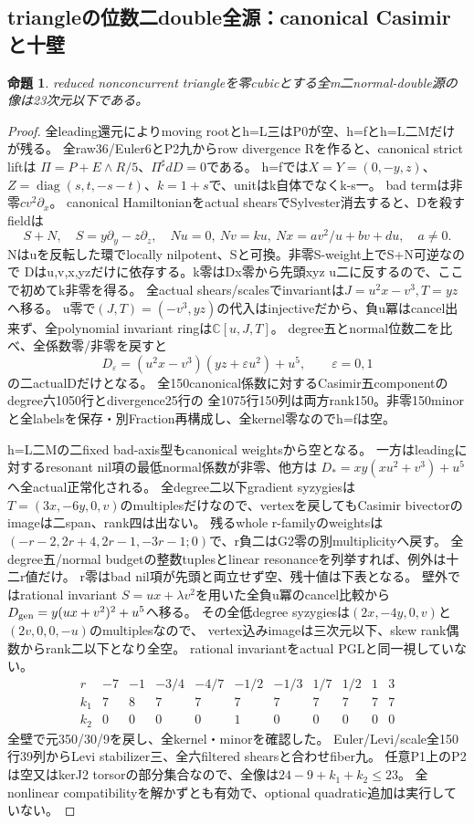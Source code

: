 \documentclass[a4paper,11pt]{ltjsarticle}
\newtheorem{proposition}{命題}[section]
\theoremstyle{definition}
\begin{document}
\subsection{triangleの位数二double全源：canonical Casimirと十壁}
\begin{proposition}\label{prop:plane-m2-triangle-double-all-G}
reduced nonconcurrent triangleを零cubicとする全m二normal-double源の像は23次元以下である。
\end{proposition}
\begin{proof}
全leading還元によりmoving rootとh=L三はP0が空、h=fとh=L二Mだけが残る。
全raw36/Euler6とP2九からrow divergence Rを作ると、canonical strict liftは
$\Pi=P+E\wedge R/5$、$\Pi^\sharp dD=0$である。
h=fでは$X=Y=(0,-y,z)$、$Z=\operatorname{diag}(s,t,-s-t)$、$k=1+s$で、unitはk自体でなくk-s一。
bad termは非零$cv^2\partial_x$。
canonical Hamiltonianをactual shearsでSylvester消去すると、Dを殺すfieldは
\[
 S+N,\quad S=y\partial_y-z\partial_z,\quad
 Nu=0,\ Nv=ku,\ Nx=av^2/u+bv+du,\quad a\ne0.
\]
Nはuを反転した環でlocally nilpotent、Sと可換。非零S-weight上でS+N可逆なので
Dはu,v,x,yzだけに依存する。k零はDx零から先頭xyz u二に反するので、ここで初めてk非零を得る。
全actual shears/scalesでinvariantは$J=u^2x-v^3,T=yz$へ移る。
u零で$(J,T)=(-v^3,yz)$の代入はinjectiveだから、負u冪はcancel出来ず、全polynomial invariant ringは$\mathbb C[u,J,T]$。
degree五とnormal位数二を比べ、全係数零/非零を戻すと
\[
 D_\varepsilon=(u^2x-v^3)(yz+\varepsilon u^2)+u^5,\qquad\varepsilon=0,1
\]
の二actualDだけとなる。
全150canonical係数に対するCasimir五componentのdegree六1050行とdivergence25行の
全1075行150列は両方rank150。非零150minorと全labelsを保存・別Fraction再構成し、全kernel零なのでh=fは空。

h=L二Mの二fixed bad-axis型もcanonical weightsから空となる。
一方はleadingに対するresonant nil項の最低normal係数が非零、他方は
$D_*=xy(xu^2+v^3)+u^5$へ全actual正常化される。
全degree二以下gradient syzygiesは$T=(3x,-6y,0,v)$のmultiplesだけなので、vertexを戻してもCasimir bivectorのimageは二span、rank四は出ない。
残るwhole r-familyのweightsは
$(-r-2,2r+4,2r-1,-3r-1;0)$で、r負二はG2零の別multiplicityへ戻す。
全degree五/normal budgetの整数tuplesとlinear resonanceを列挙すれば、例外は十二r値だけ。
r零はbad nil項が先頭と両立せず空、残十値は下表となる。
壁外ではrational invariant $S=ux+\lambda v^2$を用いた全負u冪のcancel比較から
$D_{\rm gen}=y(ux+v^2)^2+u^5$へ移る。
その全低degree syzygiesは$(2x,-4y,0,v)$と$(2v,0,0,-u)$のmultiplesなので、
vertex込みimageは三次元以下、skew rank偶数からrank二以下となり全空。
rational invariantをactual PGLと同一視していない。
\[
\begin{array}{c|rrrrrrrrrr}
 r&-7&-1&-3/4&-4/7&-1/2&-1/3&1/7&1/2&1&3\\\hline
 k_1&7&8&7&7&7&7&7&7&7&7\\
 k_2&0&0&0&0&1&0&0&0&0&0
\end{array}
\]
全壁で元350/30/9を戻し、全kernel・minorを確認した。
Euler/Levi/scale全150行39列からLevi stabilizer三、全六filtered shearsと合わせfiber九。
任意P1上のP2は空又はkerJ2 torsorの部分集合なので、全像は$24-9+k_1+k_2\le23$。
全nonlinear compatibilityを解かずとも有効で、optional quadratic追加は実行していない。
\end{proof}
\end{document}
